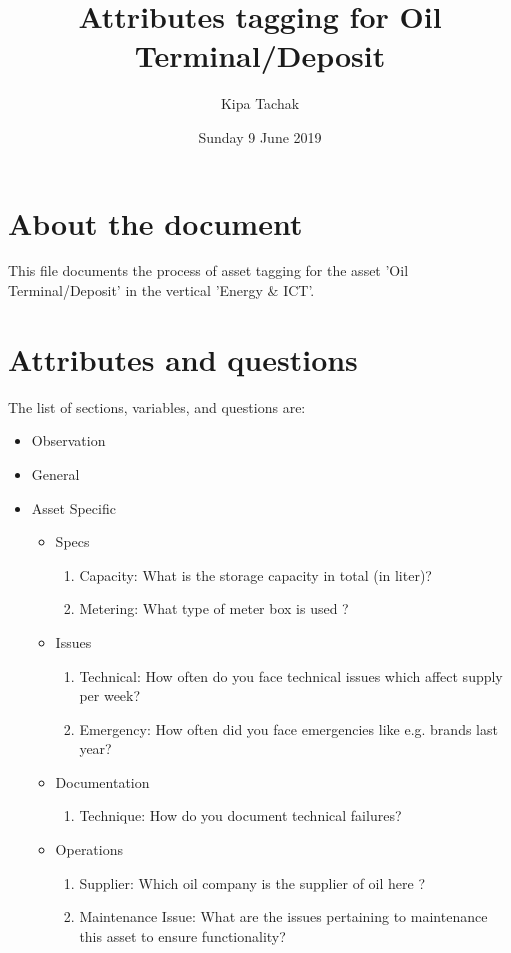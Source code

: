 \documentclass[oneside,twocolumn]{article}
\title{Attributes tagging for Oil Terminal/Deposit}
\author{Kipa Tachak}
\date{Sunday  9 June 2019}
\begin{document}
\maketitle

\section{About the document}
This file documents the process of asset tagging for the asset 'Oil Terminal/Deposit' in the
vertical 'Energy \& ICT'.

\section{Attributes and questions}
The list of sections, variables, and questions are:
    \begin{itemize}
    \item Observation
    \item General
    \item Asset Specific
    \begin{itemize}
\item Specs
\begin{enumerate}
\item Capacity: What is the storage capacity in total (in liter)?
\item Metering: What type of meter box is used ?
\end{enumerate}

\item Issues
\begin{enumerate}
\item Technical: How often do you face technical issues which affect supply per week?
\item Emergency: How often did you face emergencies like e.g. brands last year?
\end{enumerate}

\item Documentation
\begin{enumerate}
\item Technique: How do you document technical failures?
\end{enumerate}

\item Operations
\begin{enumerate}
\item Supplier: Which oil company is the supplier of oil here ?
\item Maintenance Issue: What are the issues pertaining to maintenance this asset to ensure functionality?
\end{enumerate}


\end{itemize}
\end{itemize}
\end{document}
